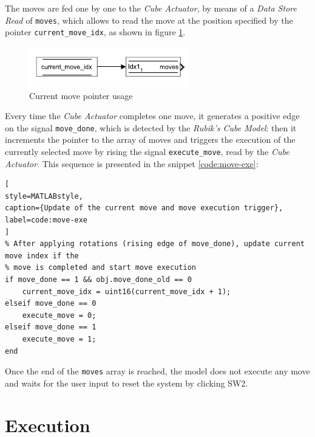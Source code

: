 \documentclass{report}
\begin{document}
The moves are fed one by one to the \textit{Cube Actuator}, by means of a \textit{Data Store Read} of \texttt{moves}, which allows to read the move at the position specified by the pointer \texttt{current\_move\_idx}, as shown in figure \ref{fig:curr-mov-pointer}.

\begin{figure}[h]
    \centering
    \includegraphics[width=0.5\linewidth]{images/rubik_cube_model/current_move_pointer.png}
    \caption{Current move pointer usage}
    \label{fig:curr-mov-pointer}
\end{figure}

Every time the \textit{Cube Actuator} completes one move, it generates a positive edge on the signal \texttt{move\_done}, which is detected by the \textit{Rubik's Cube Model}: then it increments the pointer to the array of moves and triggers the execution of the currently selected move by rising the signal \texttt{execute\_move}, read by the \textit{Cube Actuator}. This sequence is presented in the snippet \ref{code:move-exe}:

\begin{lstlisting}[
style=MATLABstyle,
caption={Update of the current move and move execution trigger},
label=code:move-exe
]
% After applying rotations (rising edge of move_done), update current move index if the
% move is completed and start move execution
if move_done == 1 && obj.move_done_old == 0
    current_move_idx = uint16(current_move_idx + 1);
elseif move_done == 0
    execute_move = 0;
elseif move_done == 1
    execute_move = 1;
end
\end{lstlisting}

Once the end of the \texttt{moves} array is reached, the model does not execute any move and waits for the user input to reset the system by clicking SW2.

\chapter{Execution}
\end{document}
